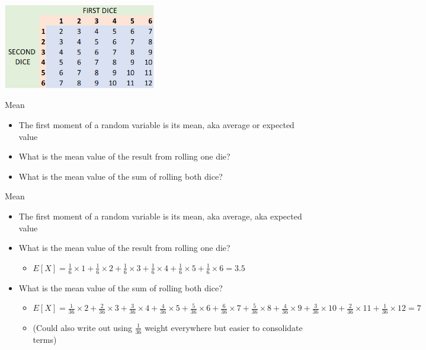 \documentclass[aspectratio=169]{beamer}
\begin{document}
\begin{frame}
    \centering
    \includegraphics[width = 0.5\textwidth,keepaspectratio]{dice.png}
\end{frame}

\begin{frame}{Mean}
    \begin{itemize}
        \item The first moment of a random variable is its mean, aka average or expected value
        \item What is the mean value of the result from rolling one die?
        \item What is the mean value of the sum of rolling both dice?
    \end{itemize}
\end{frame}

\begin{frame}{Mean}
    \begin{itemize}
        \item The first moment of a random variable is its mean, aka average, aka expected value
        \item What is the mean value of the result from rolling one die?
        \begin{itemize}
            \item $E[X] = \frac{1}{6} \times 1 + \frac{1}{6} \times 2 + \frac{1}{6} \times 3 + \frac{1}{6} \times 4 + \frac{1}{6} \times 5 + \frac{1}{6} \times 6 = 3.5$
        \end{itemize}
        \item What is the mean value of the sum of rolling both dice?
        \begin{itemize}
            \item $E[X] = \frac{1}{36} \times 2 + \frac{2}{36} \times 3 + \frac{3}{36} \times 4 + \frac{4}{36} \times 5 + \frac{5}{36} \times 6 + \frac{6}{36} \times 7 + \frac{5}{36} \times 8 + \frac{4}{36} \times 9 + \frac{3}{36} \times 10 + \frac{2}{36} \times 11 + \frac{1}{36} \times 12 = 7$
            \item (Could also write out using $\frac{1}{36}$ weight everywhere but easier to consolidate terms)
        \end{itemize}
    \end{itemize}
\end{frame}
\end{document}
